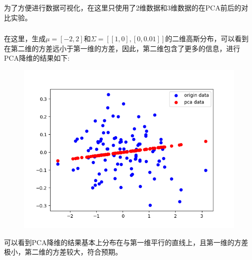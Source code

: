\documentclass[lang=cn,a4paper,cite=authoryear]{elegantpaper}
\begin{document}
\section*{}
\subsection*{}
为了方便进行数据可视化，在这里只使用了2维数据和3维数据的在PCA前后的对比实验。
\subsubsection*{}
在这里，生成$\mu=[-2,2]$和$\Sigma=[[1,0],[0,0.01]]$的二维高斯分布，可以看到在第二维的方差远小于第一维的方差，因此，第二维包含了更多的信息，进行PCA降维的结果如下:
\begin{center}
	\begin{figure}[H]
		\centering
		\includegraphics[scale=0.6]{test01}
	\end{figure}
\end{center}
可以看到PCA降维的结果基本上分布在与第一维平行的直线上，且第一维的方差极小，第二维的方差较大，符合预期。
\end{document}
